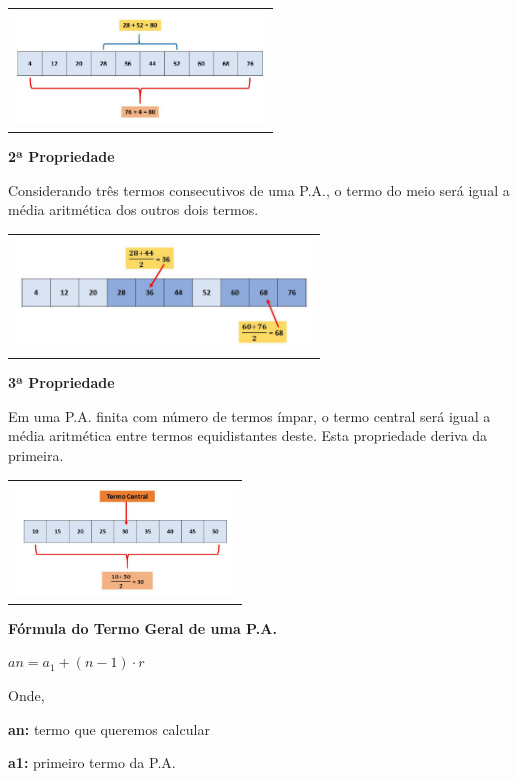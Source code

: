 \begin{multicols*}{2}
    \begin{tabular}{@{}c@{}}
        \includegraphics[height=30mm]{assets/papropriedade1.jpg}
    \end{tabular}

    \textbf{2ª Propriedade}

    Considerando três termos consecutivos de uma P.A., o termo do meio será igual a média aritmética dos outros dois termos.

    \begin{tabular}{@{}c@{}}
        \includegraphics[height=30mm]{assets/papropriedade2.jpg}
    \end{tabular}

    \textbf{3ª Propriedade}

    Em uma P.A. finita com número de termos ímpar, o termo central será igual a média aritmética entre termos equidistantes deste. Esta propriedade deriva da primeira.

    \begin{tabular}{@{}c@{}}
        \includegraphics[height=30mm]{assets/papropriedade3.jpg}
    \end{tabular}

    \textbf{Fórmula do Termo Geral de uma P.A.}

    $ an = a_1 + (n - 1) \cdot r $

    Onde,

    \textbf{an:} termo que queremos calcular

    \textbf{a1:} primeiro termo da P.A.


\end{multicols*}

